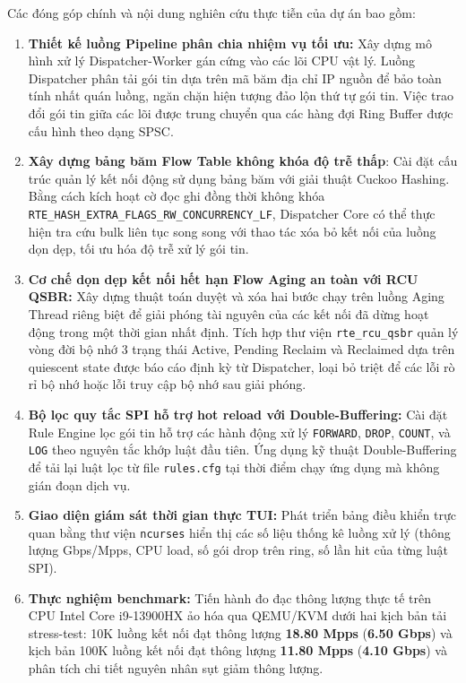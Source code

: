 \documentclass[12pt,a4paper,twoside]{report}
\begin{document}
Các đóng góp chính và nội dung nghiên cứu thực tiễn của dự án bao gồm:
\begin{enumerate}
    \item \textbf{Thiết kế luồng Pipeline phân chia nhiệm vụ tối ưu:} Xây dựng mô hình xử lý Dispatcher-Worker gán cứng vào các lõi CPU vật lý. Luồng Dispatcher phân tải gói tin dựa trên mã băm địa chỉ IP nguồn để bảo toàn tính nhất quán luồng, ngăn chặn hiện tượng đảo lộn thứ tự gói tin. Việc trao đổi gói tin giữa các lõi được trung chuyển qua các hàng đợi Ring Buffer được cấu hình theo dạng SPSC.
    \item \textbf{Xây dựng bảng băm Flow Table không khóa độ trễ thấp}: Cài đặt cấu trúc quản lý kết nối động sử dụng bảng băm với giải thuật Cuckoo Hashing. Bằng cách kích hoạt cờ đọc ghi đồng thời không khóa \texttt{RTE\_HASH\_}\allowbreak\texttt{EXTRA\_}\allowbreak\texttt{FLAGS\_}\allowbreak\texttt{RW\_}\allowbreak\texttt{CONCURRENCY\_}\allowbreak\texttt{LF}, Dispatcher Core có thể thực hiện tra cứu bulk liên tục song song với thao tác xóa bỏ kết nối của luồng dọn dẹp, tối ưu hóa độ trễ xử lý gói tin.
    \item \textbf{Cơ chế dọn dẹp kết nối hết hạn Flow Aging an toàn với RCU QSBR:} Xây dựng thuật toán duyệt và xóa hai bước chạy trên luồng Aging Thread riêng biệt để giải phóng tài nguyên của các kết nối đã dừng hoạt động trong một thời gian nhất định. Tích hợp thư viện \texttt{rte\_rcu\_qsbr} quản lý vòng đời bộ nhớ 3 trạng thái Active, Pending Reclaim và Reclaimed dựa trên quiescent state được báo cáo định kỳ từ Dispatcher, loại bỏ triệt để các lỗi rò rỉ bộ nhớ hoặc lỗi truy cập bộ nhớ sau giải phóng.
    \item \textbf{Bộ lọc quy tắc SPI hỗ trợ hot reload với Double-Buffering:} Cài đặt Rule Engine lọc gói tin hỗ trợ các hành động xử lý \texttt{FORWARD}, \texttt{DROP}, \texttt{COUNT}, và \texttt{LOG} theo nguyên tắc khớp luật đầu tiên. Ứng dụng kỹ thuật Double-Buffering để tải lại luật lọc từ file \texttt{rules.cfg} tại thời điểm chạy ứng dụng mà không gián đoạn dịch vụ.
    \item \textbf{Giao diện giám sát thời gian thực TUI:} Phát triển bảng điều khiển trực quan bằng thư viện \texttt{ncurses} hiển thị các số liệu thống kê luồng xử lý (thông lượng Gbps/Mpps, CPU load, số gói drop trên ring, số lần hit của từng luật SPI).
    \item \textbf{Thực nghiệm benchmark:} Tiến hành đo đạc thông lượng thực tế trên CPU Intel Core i9-13900HX ảo hóa qua QEMU/KVM dưới hai kịch bản tải stress-test: 10K luồng kết nối đạt thông lượng \textbf{18.80 Mpps} (\textbf{6.50 Gbps}) và kịch bản 100K luồng kết nối đạt thông lượng \textbf{11.80 Mpps} (\textbf{4.10 Gbps}) và phân tích chi tiết nguyên nhân sụt giảm thông lượng.
\end{enumerate}
\end{document}
